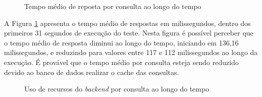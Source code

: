 \begin{figure}[H]
    \caption{Tempo médio de reposta por consulta ao longo do tempo}
    \centering
    \label{fig:search-response-over-time}
\end{figure}

A Figura \ref{fig:search-response-over-time} apresenta o tempo médio de respostas
em milissegundos, dentro dos primeiros 31 segundos de execução do teste. Nesta figura
é possível perceber que o tempo médio de resposta diminui ao longo do tempo, iniciando
em 136,16 milissegundos, e reduzindo para valores entre 117 e 112 milissegundos ao longo
da execução. É provável que o tempo médio por consulta esteja sendo reduzido devido ao
banco de dados realizar o cache das consultas.

\begin{figure}[H]
    \caption{Uso de recursos do \emph{backend} por consulta ao longo do tempo}
    \centering
    \label{fig:resource-usage-advanced-search}
\end{figure}

